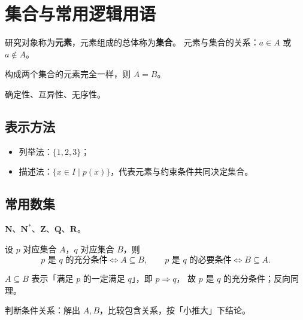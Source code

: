 \section{集合与常用逻辑用语}

\begin{definition}[集合与元素]
研究对象称为\textbf{元素}，元素组成的总体称为\textbf{集合}。
元素与集合的关系：$a\in A$ 或 $a\notin A$。
\end{definition}

\begin{definition}[集合相等]
构成两个集合的元素完全一样，则 $A=B$。
\end{definition}

\begin{definition}[元素三性]
确定性、互异性、无序性。
\end{definition}

\subsection{表示方法}
\begin{itemize}
  \item 列举法：$\{1,2,3\}$；
  \item 描述法：$\{x\in I\mid p(x)\}$，代表元素与约束条件共同决定集合。
\end{itemize}

\subsection{常用数集}
$\mathbf{N}$、$\mathbf{N}^{*}$、$\mathbf{Z}$、$\mathbf{Q}$、$\mathbf{R}$。

\begin{theorem}[包含与条件]
设 $p$ 对应集合 $A$，$q$ 对应集合 $B$，则
\[
  p\text{ 是 }q\text{ 的充分条件}\iff A\subseteq B,\qquad
  p\text{ 是 }q\text{ 的必要条件}\iff B\subseteq A.
\]
\end{theorem}

\begin{derivation}
$A\subseteq B$ 表示「满足 $p$ 的一定满足 $q$」，即 $p\Rightarrow q$，
故 $p$ 是 $q$ 的充分条件；反向同理。
\end{derivation}

\begin{summary}
判断条件关系：解出 $A,B$，比较包含关系，按「小推大」下结论。
\end{summary}
